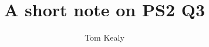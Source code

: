 \documentclass[11pt]{article}
\begin{document}
\title{A short note on PS2 Q3}
\author{Tom Kealy}
\end{document}
